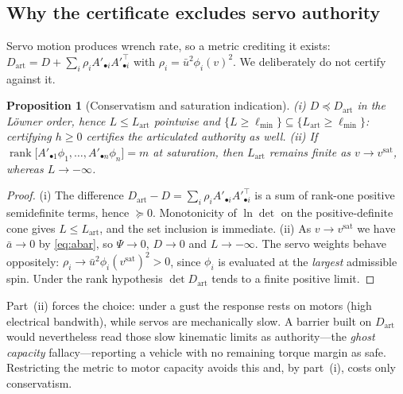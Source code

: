 \documentclass[letter, 10 pt, journal, twoside]{IEEEtran}
\theoremstyle{compact}
\newtheorem{proposition}[theorem]{Proposition}
\begin{document}

\subsection{Why the certificate excludes servo authority}
 
Servo motion produces wrench rate, so a metric crediting it exists: $D_{\mathrm{art}} = D + \sum_i \rho_i A'_{\bullet i}A'^{\top}_{\bullet i}$ with $\rho_i=\bar u^2\phi_i(v)^2$. We deliberately do not certify against it.
 
\begin{proposition}[Conservatism and saturation indication]\label{prop:optionA}
\emph{(i)} $D \preceq D_{\mathrm{art}}$ in the L\"owner order, hence $L\le L_{\mathrm{art}}$ pointwise and $\{L\ge\ell_{\min}\}\subseteq\{L_{\mathrm{art}}\ge\ell_{\min}\}$: certifying $h\ge0$ certifies the articulated authority as well. 
\emph{(ii)} If $\operatorname{rank}\big[A'_{\bullet 1}\phi_1,\dots,A'_{\bullet n}\phi_n\big]=m$ at saturation, then $L_{\mathrm{art}}$ remains finite as $v\to v^{\mathrm{sat}}$, whereas $L\to-\infty$.
\end{proposition}
 
\begin{proof}
(i) The difference $D_{\mathrm{art}}-D=\sum_i\rho_i A'_{\bullet i}A'^{\top}_{\bullet i}$ is a sum of rank-one positive semidefinite terms, hence $\succeq0$. Monotonicity of $\ln\det$ on the positive-definite cone gives $L\le L_{\mathrm{art}}$, and the set inclusion is immediate.
(ii) As $v\to v^{\mathrm{sat}}$ we have $\bar a\to0$ by \eqref{eq:abar}, so $\Psi\to0$, $D\to0$ and $L\to-\infty$. The servo weights behave oppositely: $\rho_i\to\bar u^2\phi_i(v^{\mathrm{sat}})^2>0$, since $\phi_i$ is evaluated at the \emph{largest} admissible spin. Under the rank hypothesis $\det D_{\mathrm{art}}$ tends to a finite positive limit.
\end{proof}
 
Part~(ii) forces the choice: under a gust the response rests on motors (high electrical bandwith), while servos are mechanically slow. A barrier built on $D_{\mathrm{art}}$ would nevertheless read those slow kinematic limits as authority---the \emph{ghost capacity} fallacy---reporting a vehicle with no remaining torque margin as safe. Restricting the metric to motor capacity avoids this and, by part~(i), costs only conservatism.

\end{document}
